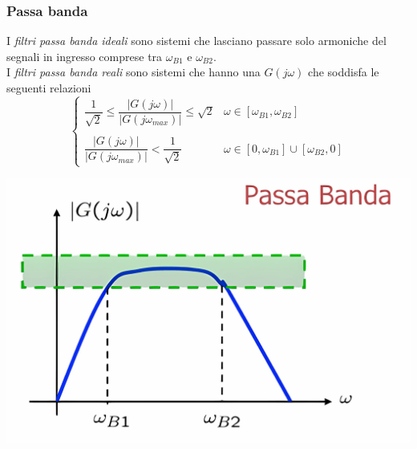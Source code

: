 \documentclass{article}
\numberwithin{equation}{subsection}
\begin{document}
\subsubsection{Passa banda}
I \textit{filtri passa banda ideali} sono sistemi che lasciano passare solo armoniche del segnali in ingresso comprese tra $\omega_{B1}$ e $\omega_{B2}$.\\
I \textit{filtri passa banda reali} sono sistemi che hanno una $G(j\omega)$ che soddisfa le seguenti relazioni
\begin{equation}
    \begin{cases}
        \dfrac{1}{\sqrt{2}} \leq \dfrac{|G(j\omega)|}{|G(j\omega_{max})|} \leq \sqrt{2} &\omega \in [\omega_{B1}, \omega_{B2}]\\
        \\
        \dfrac{|G(j\omega)|}{|G(j\omega_{max})|} < \dfrac{1}{\sqrt{2}} & \omega \in [0, \omega_{B1}] \cup [\omega_{B2}, 0]
    \end{cases}
\end{equation}
\begin{center}
    \includegraphics[scale=0.15]{Images/Passa_banda.png}
\end{center}
\end{document}
